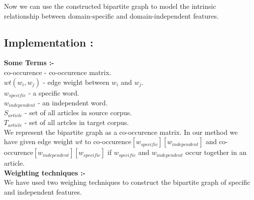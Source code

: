 \documentclass{report}
\begin{document}
Now we can use the constructed bipartite graph to model the intrinsic relationship between domain-specific and domain-independent features.\\

\subsection{Implementation :}
\textbf{Some Terms :-}\\
co-occurence \quad - \quad co-occurence matrix.\\
\(wt(w_{i},w_{j})\) \quad - \quad edge weight between \(w_{i}\) and \(w_{j}\).\\
\(w_{specific}\) \quad - \quad a specific word.\\
\(w_{independent}\) \quad - \quad an independent word.\\
\(S_{article}\) \quad - \quad set of all articles in source corpus.\\
\(T_{article}\) \quad - \quad set of all artcles  in target corpus. \\
\linebreak
We represent the bipartite graph as a co-occurence matrix. In our method we have given edge weight \(wt\) to co-occurence\([w_{specific}][w_{independent}]\) and co-occurence\([w_{independent}][w_{specific}]\) if \(w_{specific}\) and \(w_{independent}\) occur together in an article.\\
\linebreak
\textbf{Weighting techniques :-}
\\
We have used two weighing techniques to construct the bipartite graph of specific and independent features.
\end{document}
